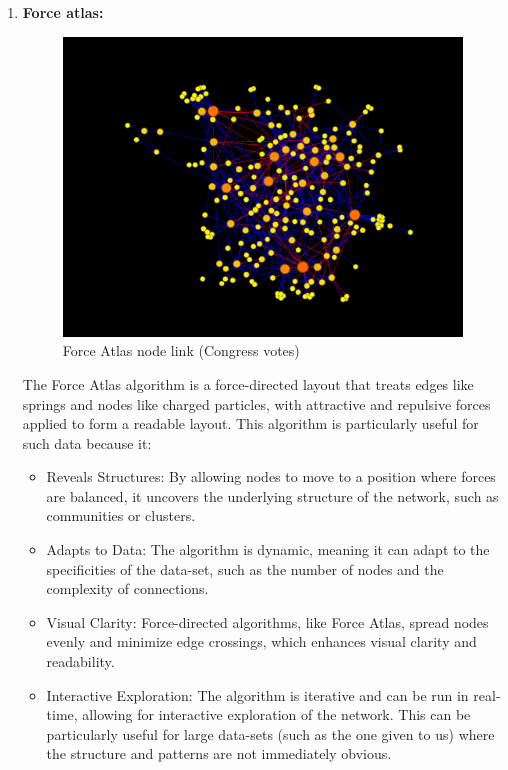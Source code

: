 \documentclass[conference]{IEEEtran}
\begin{document}
\begin{enumerate}
\begin{enumerate}
    \item 
    \textbf{Force atlas: }
    \begin{figure}
        \centering
        \includegraphics[width=1\linewidth]{ForceAtlas2_Dv_2.png}
        \caption{Force Atlas node link (Congress votes)}
        \label{fig:enter-label}
    \end{figure}
    The Force Atlas algorithm is a force-directed layout that treats edges like springs and nodes like charged particles, with attractive and repulsive forces applied to form a readable layout. This algorithm is particularly useful for such data because it:
    \begin{itemize}
        \item Reveals Structures: By allowing nodes to move to a position where forces are balanced, it uncovers the underlying structure of the network, such as communities or clusters.
  
        \item Adapts to Data: The algorithm is dynamic, meaning it can adapt to the specificities of the data-set, such as the number of nodes and the complexity of connections.
  
        \item Visual Clarity: Force-directed algorithms, like Force Atlas, spread nodes evenly and minimize edge crossings, which enhances visual clarity and readability.

        \item Interactive Exploration: The algorithm is iterative and can be run in real-time, allowing for interactive exploration of the network. This can be particularly useful for large data-sets (such as the one given to us) where the structure and patterns are not immediately obvious.
    \end{itemize}


\end{enumerate}
\end{enumerate}
\end{document}
